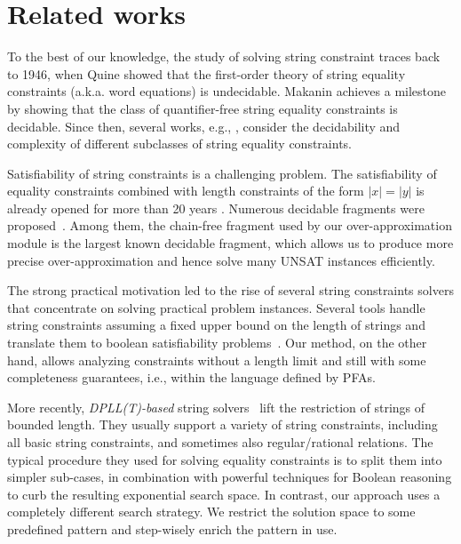 \documentclass[sigplan,screen]{acmart}
\begin{document}




\section{Related works} 
\label{section:related}
To the best of our knowledge, the study of solving string constraint traces back to 1946, when Quine \cite{quine1946concatenation} showed that the first-order theory of string equality constraints (a.k.a. word equations) is undecidable. Makanin achieves a milestone \cite{makanin1977problem} by showing that the class of quantifier-free string equality constraints is decidable.
Since then, several works, e.g., \cite{plandowski1999satisfiability,plandowski2006efficient,matiyasevich2008computation,robson1999quadratic,schulz1990makanin,ganesh2012word,ganesh2016undecidability}, consider the decidability and complexity of different subclasses of string equality constraints. 

Satisfiability of string constraints is a challenging problem. The satisfiability of equality constraints combined with length constraints of the form $|x|=|y|$ is already opened for more than 20 years \cite{buchi1990definability}.
Numerous decidable fragments were proposed~\cite{abdulla2014string,barcelo2013graph,lin2016string,chen2017decidable,chen2019decision,abdulla2019chain}. Among them, the chain-free fragment \cite{abdulla2019chain} used by our over-approximation module is the largest known decidable fragment, which allows us to produce more precise over-approximation and hence solve many UNSAT instances efficiently.

The strong practical motivation led to the rise of several string constraints solvers that concentrate on solving practical problem instances. Several tools handle string constraints assuming a fixed upper bound on the length of strings and translate them to boolean satisfiability problems~\cite{kiezun2009hampi,saxena2010symbolic,saxena2010flax}.  Our method, on the other hand, allows analyzing constraints without a length limit and still with some completeness guarantees, i.e., within the language defined by PFAs.

More recently,  {\it DPLL(T)-based} string solvers~\cite{berzish2017z3str3,zheng2017z3str2,cvc4Tool,trinh2014s3,trinh2016progressive,abdulla2015norn,abdulla2018trau,sloth,chen2019decision} lift the
restriction of strings of bounded length. They usually support a variety of string constraints, including all basic string constraints, and sometimes also regular/rational relations. 
The typical procedure they used for solving equality constraints is to split them into simpler sub-cases, in combination with powerful techniques for Boolean reasoning to curb the resulting exponential search space. In contrast, our approach uses a completely different search strategy. We restrict the solution space to some predefined pattern and step-wisely enrich the pattern in use.
\end{document}
